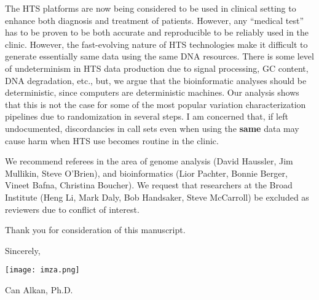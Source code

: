 \documentclass[10pt]{article}
\begin{document}
The HTS platforms are now being considered to be used in clinical setting to enhance both diagnosis and treatment of patients. However, any ``medical test''
has to be proven to be both accurate and reproducible  to be reliably used in the clinic. However, the fast-evolving nature of HTS technologies make it difficult
to generate essentially same data using the same DNA resources. There is some level of undeterminism in HTS data production due to signal processing, GC content, DNA degradation, etc., but, 
we argue that the bioinformatic analyses should be deterministic, since computers are deterministic machines. Our analysis shows that this is not the case for some of the most popular variation characterization pipelines due to randomization in several steps. I am concerned that, if left undocumented, discordancies in call sets even when using the {\bf same} data
 may cause harm when HTS use becomes routine in the clinic.

We recommend referees in the area of genome analysis (David Haussler, Jim Mullikin, Steve O'Brien), and
bioinformatics (Lior Pachter, Bonnie Berger, Vineet Bafna, Christina Boucher).
We request that researchers at the Broad Institute (Heng Li, Mark Daly, Bob Handsaker, Steve McCarroll) be excluded as reviewers due to conflict of interest.

Thank you for consideration of this manuscript.

Sincerely,

\vspace*{0.4cm}

\noindent\texttt{[image: imza.png]} 

\vspace*{0.4cm}
\noindent Can Alkan, Ph.D. \\

\end{document}
